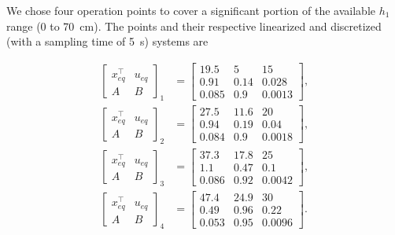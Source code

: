 We chose four operation points to cover a significant portion of the available
\(h_{1}\) range (0 to \SI{70}{\centi\metre}). The points and their respective
linearized and discretized (with a sampling time of \SI{5}{\second}) systems are

\begin{align}
  \label{eq:op-points}
  \left[\begin{array}{c|c}
      x_{eq}^{\top} & u_{eq} \\
      \hline
      A             & B
    \end{array}\right]_{1} & = \left[\begin{array}{cc|c}
      19.5  & 5    & 15     \\
      \hline
      0.91  & 0.14 & 0.028  \\
      0.085 & 0.9  & 0.0013
    \end{array}\right], \\
  \left[\begin{array}{c|c}
      x_{eq}^{\top} & u_{eq} \\
      \hline
      A             & B
    \end{array}\right]_{2} & = \left[\begin{array}{cc|c}
      27.5  & 11.6 & 20     \\
      \hline
      0.94  & 0.19 & 0.04   \\
      0.084 & 0.9  & 0.0018
    \end{array}\right], \\
  \left[\begin{array}{c|c}
      x_{eq}^{\top} & u_{eq} \\
      \hline
      A             & B
    \end{array}\right]_{3} & = \left[\begin{array}{cc|c}
      37.3  & 17.8 & 25     \\
      \hline
      1.1   & 0.47 & 0.1    \\
      0.086 & 0.92 & 0.0042
    \end{array}\right], \\
  \left[\begin{array}{c|c}
      x_{eq}^{\top} & u_{eq} \\
      \hline
      A             & B
    \end{array}\right]_{4} & = \left[\begin{array}{cc|c}
      47.4  & 24.9 & 30     \\
      \hline
      0.49  & 0.96 & 0.22   \\
      0.053 & 0.95 & 0.0096
    \end{array}\right].
\end{align}

